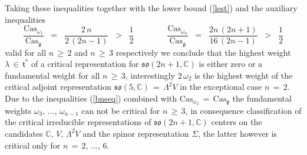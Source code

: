 \documentclass[12pt]{article}
\def\C{\mathbb{C}}
\def\Cas{\mathrm{Cas}}
\def\g{\mathfrak{g}}
\def\L{\Lambda}
\def\so{\mathfrak{so}}
\def\t{\mathfrak{t}}
\begin{document}
 Taking these inequalities together with the lower bound (\ref{lest})
 and the auxiliary inequalities
 $$
  \frac{\Cas_{\omega_1}}{\Cas_\g}
  \;\;=\;\;
  \frac{2\,n}{2\,(2n-1)}
  \;\;>\;\;
  \frac12
  \qquad\qquad
  \frac{\Cas_{\omega_n}}{\Cas_\g}
  \;\;=\;\;
  \frac{2n\,(2n+1)}{16\,(2n-1)}
  \;\;>\;\;
  \frac12
 $$
 valid for all $n\,\geq\,2$ and $n\,\geq\,3$ respectively we conclude that
 the highest weight $\lambda\,\in\,\t^*$ of a critical representation for
 $\so(2n+1,\C)$ is either zero or a fundamental weight for all $n\,\geq\,3$,
 interestingly $2\,\omega_2$ is the highest weight of the critical adjoint
 representation $\so(5,\C)\,=\,\L^2V$ in the exceptional case $n\,=\,2$.
 Due to the inequalities (\ref{bnseq}) combined with $\Cas_{\omega_2}\,=\,
 \Cas_\g$ the fundamental weights $\omega_3,\,\ldots,\,\omega_{n-1}$ can not
 be critical for $n\,\geq\,3$, in consequence classification of the critical
 irreducible representations of $\so(2n+1,\C)$ centers on the candidates
 $\C,\,V,\,\L^2V$ and the spinor representation $\Sigma$, the latter however
 is critical only for $n\,=\,2,\,\ldots,\,6$.
\end{document}
